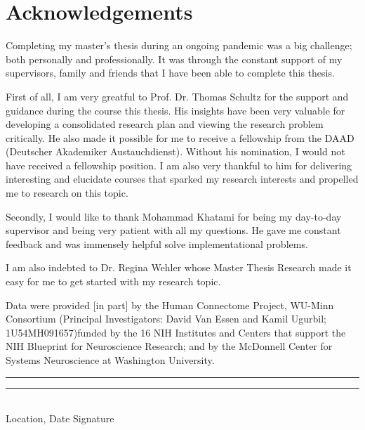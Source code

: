 \chapter{Acknowledgements}
\thispagestyle{empty}

\noindent%
Completing my master's thesis during an ongoing pandemic was a big challenge; both personally and professionally. It was through the constant support of my supervisors, family and friends that I have been able to complete this thesis. 

First of all, I am very greatful to Prof. Dr. Thomas Schultz for the support and guidance during the course this thesis. His insights have been very valuable for developing a consolidated research plan and viewing the research problem critically. He also made it possible for me to receive a fellowship from the DAAD (Deutscher Akademiker Austauchdienst). Without his nomination, I would not have received a fellowship position. I am also very thankful to him for delivering interesting and elucidate courses that sparked my research interests and propelled me to research on this topic.

Secondly, I would like to thank Mohammad Khatami for being my day-to-day supervisor and being very patient with all my questions. He gave me constant feedback and was immensely helpful solve implementational problems. 

I am also indebted to Dr. Regina Wehler whose Master Thesis Research made it easy for me to get started with my research topic.

Data were provided [in part] by the Human Connectome Project, WU-Minn Consortium (Principal Investigators: David Van Essen and Kamil Ugurbil; 1U54MH091657)funded by the 16 NIH Institutes and Centers that support the NIH Blueprint for Neuroscience Research; and by the McDonnell Center for Systems Neuroscience at Washington University. 
\vfill
\noindent%
\rule[1em]{8em}{0.5pt}  \hfill \rule[1em]{8em}{0.5pt}\\ %
Location, Date \hfill Signature\\
